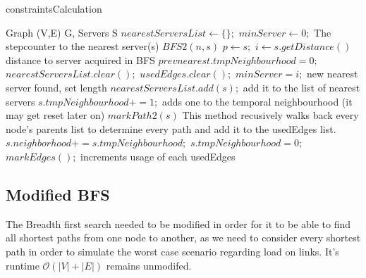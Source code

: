 \documentclass [12pt]{article}
\begin{document}
    \begin{algorithm}[H]
        \caption{constraintsCalculation}
        \begin{algorithmic}[2]
            \Require Graph (V,E) G, Servers S
                    \State $nearestServersList \gets \{\};$ 
                    \State $minServer \gets 0;$ \Comment The stepcounter to the nearest server(s)
                        \State $BFS2(n,s)$
                        \State $p \gets s;$
                        \State $i \gets s.getDistance() $ \Comment distance to server acquired in BFS 
                                    \State $prevnearest.tmpNeighbourhood=0;$
                                    \State $nearestServersList.clear();$
                                    \State $usedEdges.clear();$
                                \EndFor
                            \EndIf
                            \State $minServer = i;$ \Comment new nearest server found, set length
                            \State $nearestServersList.add(s);$ \Comment add it to the list of nearest servers 
                            \State $s.tmpNeighbourhood += 1;$ \Comment adds one to the temporal neighbourhood (it may get reset later on)
                            \State $markPath2(s)$ \Comment This method recusively walks back every node's parents list to determine every path and add it to the usedEdges list.
                        \EndIf 
                    \EndFor
                            \State $s.neighborhood += s.tmpNeighbourhood;$
                            \State $s.tmpNeighbourhood = 0;$
                        \EndFor
                    \State $markEdges();$ \Comment increments usage of each usedEdges
                \EndIf
            \EndFor
        \end{algorithmic}
    \end{algorithm}
    \subsection{Modified BFS}
    The Breadth first search needed to be modified in order for it to be able to find all shortest paths
    from one node to another, as we need to consider every shortest path in order to simulate
    the worst case scenario regarding load on links. It's runtime $\mathcal O(|V| + |E|)$ remains unmodifed.
\end{document}
